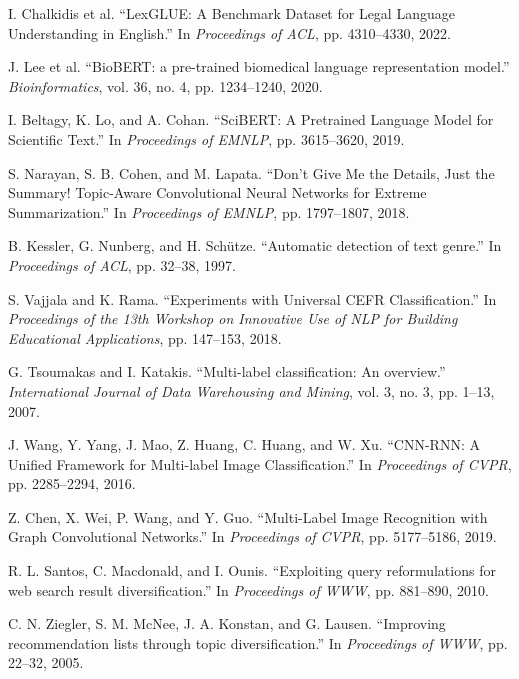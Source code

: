 \documentclass{article}
\begin{document}
\begin{thebibliography}{99}
I. Chalkidis et al.
``LexGLUE: A Benchmark Dataset for Legal Language Understanding in English.''
In \textit{Proceedings of ACL}, pp. 4310--4330, 2022.

J. Lee et al.
``BioBERT: a pre-trained biomedical language representation model.''
\textit{Bioinformatics}, vol. 36, no. 4, pp. 1234--1240, 2020.

I. Beltagy, K. Lo, and A. Cohan.
``SciBERT: A Pretrained Language Model for Scientific Text.''
In \textit{Proceedings of EMNLP}, pp. 3615--3620, 2019.

S. Narayan, S. B. Cohen, and M. Lapata.
``Don't Give Me the Details, Just the Summary! Topic-Aware Convolutional Neural Networks for Extreme Summarization.''
In \textit{Proceedings of EMNLP}, pp. 1797--1807, 2018.

B. Kessler, G. Nunberg, and H. Schütze.
``Automatic detection of text genre.''
In \textit{Proceedings of ACL}, pp. 32--38, 1997.

S. Vajjala and K. Rama.
``Experiments with Universal CEFR Classification.''
In \textit{Proceedings of the 13th Workshop on Innovative Use of NLP for Building Educational Applications}, pp. 147--153, 2018.

G. Tsoumakas and I. Katakis.
``Multi-label classification: An overview.''
\textit{International Journal of Data Warehousing and Mining}, vol. 3, no. 3, pp. 1--13, 2007.

J. Wang, Y. Yang, J. Mao, Z. Huang, C. Huang, and W. Xu.
``CNN-RNN: A Unified Framework for Multi-label Image Classification.''
In \textit{Proceedings of CVPR}, pp. 2285--2294, 2016.

Z. Chen, X. Wei, P. Wang, and Y. Guo.
``Multi-Label Image Recognition with Graph Convolutional Networks.''
In \textit{Proceedings of CVPR}, pp. 5177--5186, 2019.

R. L. Santos, C. Macdonald, and I. Ounis.
``Exploiting query reformulations for web search result diversification.''
In \textit{Proceedings of WWW}, pp. 881--890, 2010.

C. N. Ziegler, S. M. McNee, J. A. Konstan, and G. Lausen.
``Improving recommendation lists through topic diversification.''
In \textit{Proceedings of WWW}, pp. 22--32, 2005.

\end{thebibliography}
\end{document}
